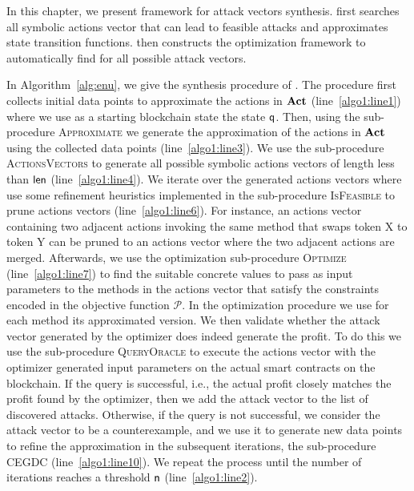 In this chapter, we present {\name} framework for attack vectors synthesis. {\name} first searches all  symbolic actions vector that can lead to feasible attacks and approximates state transition functions. {\name} then constructs the optimization framework to automatically find for all possible attack vectors. 

In Algorithm~\ref{alg:enu}, we give the synthesis procedure of {\name}.  The procedure first collects initial data points to approximate the actions in $\mathbf{Act}$ (line~\ref{algo1:line1}) where we use as a starting blockchain state the state $\mathsf{q}$. Then, using the sub-procedure \textsc{Approximate} we generate the approximation of the actions in $\mathbf{Act}$ using the collected data points (line~\ref{algo1:line3}). We use the sub-procedure \textsc{ActionsVectors} to generate all possible symbolic actions vectors of length less than $\mathsf{len}$ (line~\ref{algo1:line4}). 
We iterate over the generated actions vectors where use some refinement heuristics implemented in the sub-procedure \textsc{IsFeasible} to prune actions vectors (line~\ref{algo1:line6}). For instance, an actions vector containing two adjacent actions invoking the same method that swaps token X to token Y can be pruned to an actions vector where the two adjacent actions are merged. Afterwards, we use the optimization sub-procedure \textsc{Optimize} (line~\ref{algo1:line7}) to find the suitable concrete values to pass as input parameters to the methods in the actions vector that satisfy the constraints encoded in the objective function $\mathcal{P}$. In the optimization procedure we use for each method its approximated version. We then validate whether the attack vector generated by the optimizer does indeed generate the profit. To do this we use the sub-procedure \textsc{QueryOracle} to execute the actions vector with the optimizer generated input parameters on the actual smart contracts on the blockchain. If the query is successful, i.e., the actual profit closely matches the profit found by the optimizer, then we add the attack vector to the list of discovered attacks. Otherwise, if the query is not successful, we consider the attack vector to be a counterexample, and we use it to generate new data points to refine the approximation in the subsequent iterations, the sub-procedure \textsc{CEGDC} (line~\ref{algo1:line10}). We repeat the process until the number of iterations reaches a threshold $\mathsf{n}$ (line~\ref{algo1:line2}).

